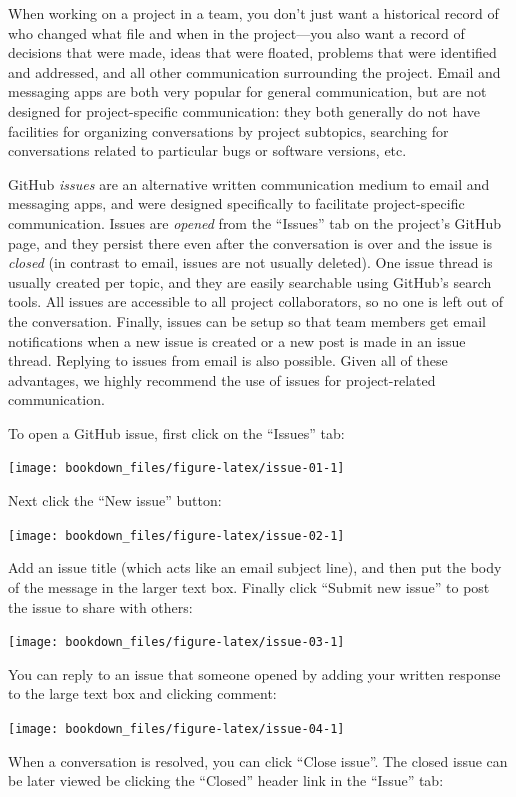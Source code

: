 \documentclass[
]{krantz}
\begin{document}
When working on a project in a team, you don't just want a historical record of who changed
what file and when in the project---you also want a record of decisions that were made,
ideas that were floated, problems that were identified and addressed, and all other
communication surrounding the project. Email and messaging apps are both very popular for general communication, but are not
designed for project-specific communication: they both generally do not have facilities for organizing conversations by project subtopics,
searching for conversations related to particular bugs or software versions, etc.

GitHub \emph{issues} are an alternative written communication medium to email and
messaging apps, and were designed specifically to facilitate project-specific
communication. Issues are \emph{opened} from the ``Issues'' tab on the project's
GitHub page, and they persist there even after the conversation is over and the issue is \emph{closed} (in
contrast to email, issues are not usually deleted). One issue thread is usually created
per topic, and they are easily searchable using GitHub's search tools. All
issues are accessible to all project collaborators, so no one is left out of
the conversation. Finally, issues can be setup so that team members get email
notifications when a new issue is created or a new post is made in an issue
thread. Replying to issues from email is also possible. Given all of these advantages,
we highly recommend the use of issues for project-related communication.

To open a GitHub issue, first click on the ``Issues'' tab:

\texttt{[image: bookdown\_files/figure-latex/issue-01-1]}

Next click the ``New issue'' button:

\texttt{[image: bookdown\_files/figure-latex/issue-02-1]}

Add an issue title (which acts like an email subject line), and then put the
body of the message in the larger text box. Finally click ``Submit new issue''
to post the issue to share with others:

\texttt{[image: bookdown\_files/figure-latex/issue-03-1]}

You can reply to an issue that someone opened by adding your written response to
the large text box and clicking comment:

\texttt{[image: bookdown\_files/figure-latex/issue-04-1]}

When a conversation is resolved, you can click ``Close issue''. The closed issue
can be later viewed be clicking the ``Closed'' header link in the ``Issue'' tab:
\end{document}
